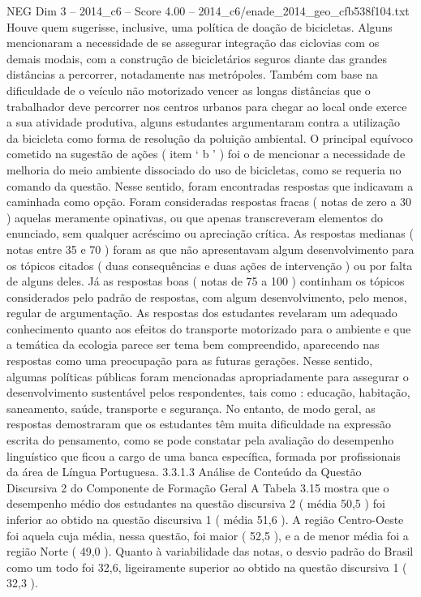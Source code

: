 \begin{textsample}{NEG Dim 3 – 2014\_c6 – Score 4.00 – 2014\_c6/enade\_2014\_geo\_cfb538f104.txt}
Houve quem sugerisse, inclusive, uma política de doação de bicicletas.
Alguns mencionaram a necessidade de se assegurar integração das ciclovias com os demais modais, com a construção de bicicletários seguros diante das grandes distâncias a percorrer, notadamente nas metrópoles.
Também com base na dificuldade de o veículo não motorizado vencer as longas distâncias que o trabalhador deve percorrer nos centros urbanos para chegar ao local onde exerce a sua atividade produtiva, alguns estudantes argumentaram contra a utilização da bicicleta como forma de resolução da poluição ambiental.
O principal equívoco cometido na sugestão de ações ( item ‘ b ’ ) foi o de mencionar a necessidade de melhoria do meio ambiente dissociado do uso de bicicletas, como se requeria no comando da questão.
Nesse sentido, foram encontradas respostas que indicavam a caminhada como opção.
Foram consideradas respostas fracas ( notas de zero a 30 ) aquelas meramente opinativas, ou que apenas transcreveram elementos do enunciado, sem qualquer acréscimo ou apreciação crítica.
As respostas medianas ( notas entre 35 e 70 ) foram as que não apresentavam algum desenvolvimento para os tópicos citados ( duas consequências e duas ações de intervenção ) ou por falta de alguns deles.
Já as respostas boas ( notas de 75 a 100 ) continham os tópicos considerados pelo padrão de respostas, com algum desenvolvimento, pelo menos, regular de argumentação.
As respostas dos estudantes revelaram um adequado conhecimento quanto aos efeitos do transporte motorizado para o ambiente e que a temática da ecologia parece ser tema bem compreendido, aparecendo nas respostas como uma preocupação para as futuras gerações.
Nesse sentido, algumas políticas públicas foram mencionadas apropriadamente para assegurar o desenvolvimento sustentável pelos respondentes, tais como : educação, habitação, saneamento, saúde, transporte e segurança.
No entanto, de modo geral, as respostas demostraram que os estudantes têm muita dificuldade na expressão escrita do pensamento, como se pode constatar pela avaliação do desempenho linguístico que ficou a cargo de uma banca específica, formada por profissionais da área de Língua Portuguesa. 3.3.1.3 Análise de Conteúdo da Questão Discursiva 2 do Componente de Formação Geral A Tabela 3.15 mostra que o desempenho médio dos estudantes na questão discursiva 2 ( média 50,5 ) foi inferior ao obtido na questão discursiva 1 ( média 51,6 ).
A região Centro-Oeste foi aquela cuja média, nessa questão, foi maior ( 52,5 ), e a de menor média foi a região Norte ( 49,0 ).
Quanto à variabilidade das notas, o desvio padrão do Brasil como um todo foi 32,6, ligeiramente superior ao obtido na questão discursiva 1 ( 32,3 ).

\end{textsample}
